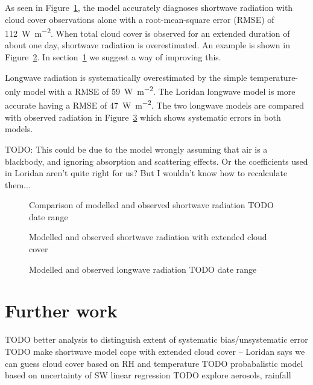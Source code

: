 \documentclass[a4paper,titlepage, twoside]{report}
\begin{document}
As seen in Figure~\ref{fig:shortwave-verification}, the model accurately diagnoses shortwave radiation with cloud cover observations alone with a root-mean-square error (RMSE) of \SI{112}{\watt\per\meter\squared}.  When total cloud cover is observed for an extended duration of about one day, shortwave radiation is overestimated.  An example is shown in Figure~\ref{fig:extended-cloud}.  In section~\ref{sec:further-work} we suggest a way of improving this.

Longwave radiation is systematically overestimated by the simple temperature-only model with a RMSE of \SI{59}{\watt\per\meter\squared}.  The Loridan longwave model is more accurate having a RMSE of \SI{47}{\watt\per\meter\squared}.  The two longwave models are compared with observed radiation in Figure~\ref{fig:longwave-verification} which shows systematic errors in both models.

TODO: This could be due to the model wrongly assuming that air is a blackbody, and ignoring absorption and scattering effects.  Or the coefficients used in Loridan aren't quite right for us?  But I wouldn't know how to recalculate them...
\begin {figure}
\centering

\caption{Comparison of modelled and observed shortwave radiation TODO date range}
\label{fig:shortwave-verification}
\end{figure}

\begin{figure}
\centering

\caption{Modelled and observed shortwave radiation with extended cloud cover}
\label{fig:extended-cloud}
\end{figure}

\begin{figure}
\centering

\caption{Modelled and observed longwave radiation TODO date range}
\label{fig:longwave-verification}
\end{figure}

\section{Further work}
\label{sec:further-work}
TODO better analysis to distinguish extent of systematic bias/unsystematic error
TODO make shortwave model cope with extended cloud cover -- Loridan says we can guess cloud cover based on RH and temperature
TODO probabalistic model based on uncertainty of SW linear regression
TODO explore aerosols, rainfall


\printbibliography
\end{document}
